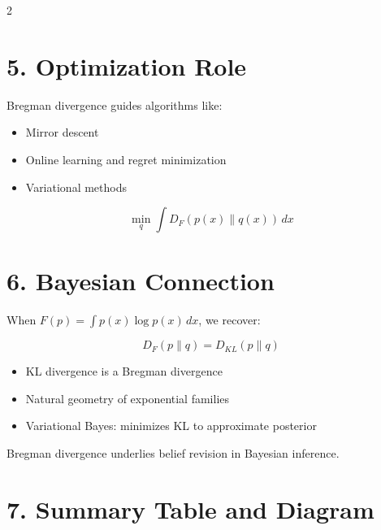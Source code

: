 \documentclass[11pt,a4paper]{article}
\begin{document}
\begin{multicols}{2}
\section{5. Optimization Role}

Bregman divergence guides algorithms like:

\begin{itemize}[leftmargin=0.5cm]
  \item Mirror descent
  \item Online learning and regret minimization
  \item Variational methods
\end{itemize}

\[
\min_q \int D_F(p(x)\parallel q(x))\,dx
\]

\end{multicols}

\section{6. Bayesian Connection}

When \( F(p) = \int p(x)\log p(x)\,dx \), we recover:

\[
D_F(p\parallel q) = D_{KL}(p\parallel q)
\]

\begin{itemize}
  \item KL divergence is a Bregman divergence
  \item Natural geometry of exponential families
  \item Variational Bayes: minimizes KL to approximate posterior
\end{itemize}

\begin{tcolorbox}
Bregman divergence underlies belief revision in Bayesian inference.
\end{tcolorbox}

\section{7. Summary Table and Diagram}

\vspace{0.2cm}
\end{document}
